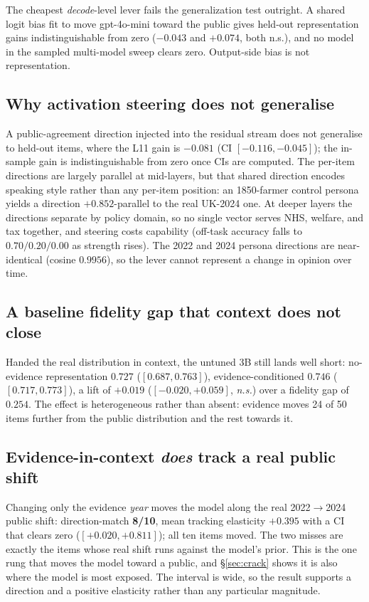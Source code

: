 \documentclass[letterpaper]{article} %
\begin{document}
The cheapest \emph{decode}-level lever fails the generalization test outright. A shared
logit bias fit to move gpt-4o-mini toward the public gives held-out representation gains
indistinguishable from zero ($-0.043$ and $+0.074$, both n.s.), and no model in the
sampled multi-model sweep clears zero. Output-side bias is not representation.

\subsection{Why activation steering does not generalise}

A public-agreement direction injected into the residual stream does not generalise to
held-out items, where the L11 gain is $-0.081$ (CI $[-0.116, -0.045]$); the in-sample
gain is indistinguishable from zero once CIs are computed. The per-item directions are
largely parallel at mid-layers, but that shared direction encodes speaking style rather
than any per-item position: an 1850-farmer control persona yields a direction
$+0.852$-parallel to the real UK-2024 one. At deeper layers the directions separate by
policy domain, so no single vector serves NHS, welfare, and tax together, and steering
costs capability (off-task accuracy falls to $0.70/0.20/0.00$ as strength rises). The
2022 and 2024 persona directions are near-identical (cosine $0.9956$), so the lever
cannot represent a change in opinion over time.

\subsection{A baseline fidelity gap that context does not close}

Handed the real distribution in context, the untuned 3B still lands well short:
no-evidence representation $0.727$ ($[0.687, 0.763]$), evidence-conditioned $0.746$
($[0.717, 0.773]$), a lift of $+0.019$ ($[-0.020, +0.059]$, \emph{n.s.}) over a fidelity
gap of $0.254$. The effect is heterogeneous rather than absent: evidence moves 24 of 50
items further from the public distribution and the rest towards it.

\subsection{Evidence-in-context \emph{does} track a real public shift}

Changing only the evidence \emph{year} moves the model along the real 2022$\to$2024
public shift: direction-match \textbf{8/10}, mean tracking elasticity $+0.395$ with a CI
that clears zero ($[+0.020, +0.811]$); all ten items moved. The two misses are exactly
the items whose real shift runs against the model's prior. This is the one rung that
moves the model toward a public, and \S\ref{sec:crack} shows it is also where the model
is most exposed. The interval is wide, so the result supports a direction and a positive
elasticity rather than any particular magnitude.
\end{document}
